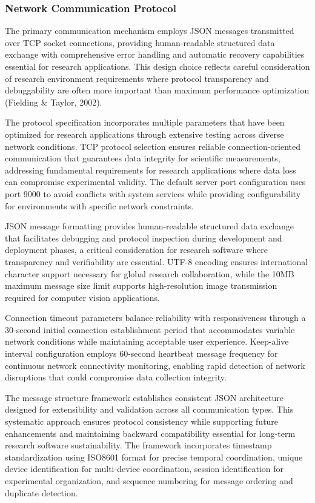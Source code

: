 \documentclass[12pt,a4paper]{article}
\begin{document}
\subsubsection{Network Communication Protocol}

The primary communication mechanism employs JSON messages transmitted over TCP socket connections, providing
human-readable structured data exchange with comprehensive error handling and automatic recovery capabilities essential
for research applications. This design choice reflects careful consideration of research environment requirements where
protocol transparency and debuggability are often more important than maximum performance optimization (Fielding \&
Taylor, 2002).

The protocol specification incorporates multiple parameters that have been optimized for research applications through
extensive testing across diverse network conditions. TCP protocol selection ensures reliable connection-oriented
communication that guarantees data integrity for scientific measurements, addressing fundamental requirements for
research applications where data loss can compromise experimental validity. The default server port configuration uses
port 9000 to avoid conflicts with system services while providing configurability for environments with specific network
constraints.

JSON message formatting provides human-readable structured data exchange that facilitates debugging and protocol
inspection during development and deployment phases, a critical consideration for research software where transparency
and verifiability are essential. UTF-8 encoding ensures international character support necessary for global research
collaboration, while the 10MB maximum message size limit supports high-resolution image transmission required for
computer vision applications.

Connection timeout parameters balance reliability with responsiveness through a 30-second initial connection
establishment period that accommodates variable network conditions while maintaining acceptable user experience.
Keep-alive interval configuration employs 60-second heartbeat message frequency for continuous network connectivity
monitoring, enabling rapid detection of network disruptions that could compromise data collection integrity.

The message structure framework establishes consistent JSON architecture designed for extensibility and validation
across all communication types. This systematic approach ensures protocol consistency while supporting future
enhancements and maintaining backward compatibility essential for long-term research software sustainability. The
framework incorporates timestamp standardization using ISO8601 format for precise temporal coordination, unique device
identification for multi-device coordination, session identification for experimental organization, and sequence
numbering for message ordering and duplicate detection.
\end{document}
